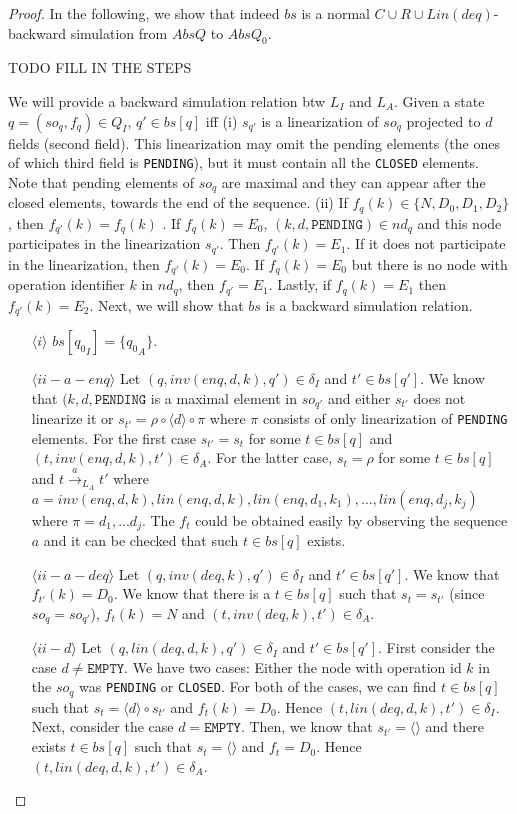\begin{proof}
In the following, we show that indeed $bs$ is a normal $C\cup R\cup Lin(deq)$-backward simulation from $AbsQ$ to $AbsQ_0$.

TODO FILL IN THE STEPS

We will provide a backward simulation relation btw $L_I$ and $L_A$. Given a state $q = (so_q, f_q) \in Q_I$,  $q' \in bs[q]$ iff (i) $s_{q'}$ is a linearization of $so_q$ projected to $d$ fields (second field). This linearization may omit the pending elements (the ones of which third field is \texttt{PENDING}), but it must contain all the \texttt{CLOSED} elements. Note that pending elements of $so_q$ are maximal and they can appear after the closed elements, towards the end of the sequence. (ii) If $f_q(k) \in \{N, D_0, D_1, D_2\}$, then $f_{q'}(k) = f_q(k)$ . If $f_q(k) = E_0$, $(k,d,\texttt{PENDING}) \in nd_q$ and this node participates in the linearization $s_{q'}$. Then $f_{q'}(k) = E_1$. If it does not participate in the linearization, then $f_{q'}(k) = E_0$. If $f_q(k) = E_0$ but there is no node with operation identifier $k$ in $nd_q$, then $f_{q'} = E_1$. Lastly, if $f_q(k) = E_1$ then $f_{q'}(k) = E_2$. Next, we will show that $bs$ is a backward simulation relation.
\begin{itemize}
\item[$\langle i \rangle$] $bs[{q_0}_I] = \{ {q_0}_A \}$.
\item[$\langle ii-a-enq \rangle$] Let $(q, inv(enq,d,k), q') \in \delta_I$ and $t' \in bs[q']$. We know that $(k,d,\texttt{PENDING}$ is a maximal element in $so_{q'}$ and either $s_{t'}$ does not linearize it or $s_{t'} = \rho \circ \langle d \rangle \circ \pi$ where $\pi$ consists of only linearization of \texttt{PENDING} elements. For the first case $s_{t'} = s_t$ for some $t \in bs[q]$ and $(t,inv(enq,d,k),t') \in \delta_A$. For the latter case, $s_t = \rho$ for some $t \in bs[q]$ and $t \xrightarrow{a}_{L_A} t'$ where $a = inv(enq,d,k), lin(enq,d,k), lin(enq,d_1,k_1),...,lin(enq,d_j,k_j)$ where $\pi = d_1,...d_j$. The $f_t$ could be obtained easily by observing the sequence $a$ and it can be checked that such $t \in bs[q]$ exists.
\item[$\langle ii-a-deq \rangle$] Let $(q, inv(deq,k), q') \in \delta_I$ and $t' \in bs[q']$. We know that $f_{t'}(k) = D_0$. We know that there is a $t \in bs[q]$ such that $s_t = s_{t'}$ (since $so_q = so_{q'}$), $f_t(k) = N$ and $(t,inv(deq,k),t') \in \delta_A$.
\item[$\langle ii-d \rangle$] Let $(q,lin(deq,d,k),q') \in \delta_I$ and $t' \in bs[q']$. First consider the case $d \neq \texttt{EMPTY}$. We have two cases: Either the node with operation id $k$ in the $so_q$ was \texttt{PENDING} or \texttt{CLOSED}. For both of the cases, we can find $t \in bs[q]$ such that $s_t = \langle d \rangle \circ s_{t'}$ and $f_t(k) = D_0$. Hence $(t,lin(deq,d,k),t') \in \delta_I$. Next, consider the case $d = \texttt{EMPTY}$. Then, we know that $s_{t'} = \langle \rangle$ and there exists $t \in bs[q]$ such that $s_t = \langle \rangle$ and $f_t = D_0$. Hence $(t,lin(deq,d,k),t') \in \delta_A$.

\end{itemize}
\end{proof}
